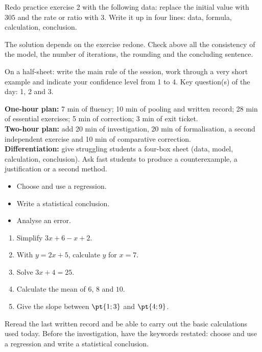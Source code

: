 
\begin{homework}Redo practice exercise 2 with the following data: replace the initial value with $305$ and the rate or ratio with $3$. Write it up in four lines: data, formula, calculation, conclusion.\end{homework}
\begin{solution}The solution depends on the exercise redone. Check above all the consistency of the model, the number of iterations, the rounding and the concluding sentence.\end{solution}

\begin{exitticket}[3 minutes]On a half-sheet: write the main rule of the session, work through a very short example and indicate your confidence level from 1 to 4. Key question(s) of the day: 1, 2 and 3.\end{exitticket}

\ifmxteacher
\begin{method}
\textbf{One-hour plan:} 7 min of fluency; 10 min of pooling and written record; 28 min of essential exercises; 5 min of correction; 3 min of exit ticket.\\
\textbf{Two-hour plan:} add 20 min of investigation, 20 min of formalisation, a second independent exercise and 10 min of comparative correction.\\
\textbf{Differentiation:} give struggling students a four-box sheet (data, model, calculation, conclusion). Ask fast students to produce a counterexample, a justification or a second method.
\end{method}
\fi
{}
\begin{objectives}\begin{itemize}\item Choose and use a regression.\item Write a statistical conclusion.\item Analyse an error.\end{itemize}\end{objectives}
\begin{fluency}\begin{enumerate}\item Simplify $3x+6-x+2$. \item With $y=2x+5$, calculate $y$ for $x=7$. \item Solve $3x+4=25$. \item Calculate the mean of $6$, $8$ and $10$. \item Give the slope between $\pt{1;3}$ and $\pt{4;9}$. \end{enumerate}\end{fluency}
\begin{prerequisites}Reread the last written record and be able to carry out the basic calculations used today. Before the investigation, have the keywords restated: choose and use a regression and write a statistical conclusion.\end{prerequisites}

